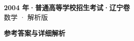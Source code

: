 \documentclass[zihao=-4, a4paper]{ctexart}
\begin{document}
\begin{center}
  {\Large\bfseries 2004 年·普通高等学校招生考试·辽宁卷}\\[4pt]
  {\large 数学 · 解析版}
\end{center}
\medskip
{}

\clearpage
{}
\begin{center}{\Large\bfseries 参考答案与详细解析}\end{center}
\medskip

\end{document}
